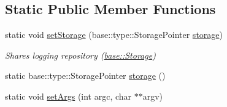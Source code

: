 \subsection*{Static Public Member Functions}
\begin{DoxyCompactItemize}
\item 
\hypertarget{classel_1_1Helpers_af78fd39725281e3dddd7c0fbdc14f11f}{static void \hyperlink{classel_1_1Helpers_af78fd39725281e3dddd7c0fbdc14f11f}{set\-Storage} (base\-::type\-::\-Storage\-Pointer \hyperlink{classel_1_1Helpers_a13a5365de36b3af27660cf9b358829d3}{storage})}\label{classel_1_1Helpers_af78fd39725281e3dddd7c0fbdc14f11f}

\begin{DoxyCompactList}\small\item\em Shares logging repository (\hyperlink{classel_1_1base_1_1Storage}{base\-::\-Storage}) \end{DoxyCompactList}\item 
static base\-::type\-::\-Storage\-Pointer \hyperlink{classel_1_1Helpers_a13a5365de36b3af27660cf9b358829d3}{storage} ()
\item 
\hypertarget{classel_1_1Helpers_a68748f618a0c2840b96dc12532b09bf0}{static void \hyperlink{classel_1_1Helpers_a68748f618a0c2840b96dc12532b09bf0}{set\-Args} (int argc, char $\ast$$\ast$argv)}\label{classel_1_1Helpers_a68748f618a0c2840b96dc12532b09bf0}


\end{DoxyCompactItemize}
